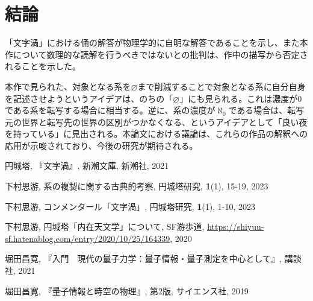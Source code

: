 \documentclass[10pt, a5paper, twoside]{jsarticle}
\theoremstyle{definition}
\begin{document}
	\section{結論}

		「文字渦」における俑の解答が物理学的に自明な解答であることを示し、また本作について数理的な読解を行うべきではないとの批判は、作中の描写から否定されることを示した。

		本作で見られた、対象となる系を$\varnothing$まで削減することで対象となる系に自分自身を記述させようというアイデアは、のちの「$\varnothing$」にも見られる。これは濃度が0である系を転写する場合に相当する。逆に、系の濃度が$\aleph_0$である場合は、転写元の世界と転写先の世界の区別がつかなくなる、というアイデアとして「良い夜を持っている」に見出される。本論文における議論は、これらの作品の解釈への応用が示唆されており、今後の研究が期待される。

	\begin{thebibliography}{99}

		 円城塔, 『文字渦』, 新潮文庫, 新潮社, 2021

		 下村思游, 系の複製に関する古典的考察, 円城塔研究, \textbf{1}(1), 15-19, 2023

		 下村思游, コンメンタール「文字渦」, 円城塔研究, \textbf{1}(1), 1-10, 2023

		 下村思游, 円城塔「内在天文学」について, SF游歩道, \url{https://shiyuu-sf.hatenablog.com/entry/2020/10/25/164339}, 2020

		 堀田昌寛, 『入門　現代の量子力学：量子情報・量子測定を中心として』, 講談社, 2021

		 堀田昌寛, 『量子情報と時空の物理』, 第2版, サイエンス社, 2019

	\end{thebibliography}
\end{document}
